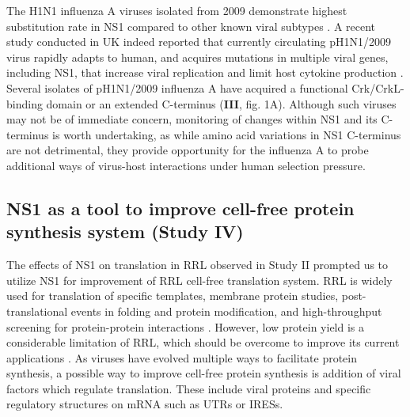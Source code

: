 		The H1N1 influenza A viruses isolated from 2009 demonstrate highest substitution rate in NS1 compared to other known viral subtypes \parencite{Xu2011}. A recent study conducted in UK indeed reported that currently circulating pH1N1/2009 virus rapidly adapts to human, and acquires mutations in multiple viral genes, including NS1, that increase viral replication and limit host cytokine production \parencite{Elderfield2014}. Several isolates of pH1N1/2009 influenza A have acquired a functional Crk/CrkL-binding domain or an extended C-terminus (\textbf{III}, fig. 1A). Although such viruses may not be of immediate concern, monitoring of changes within NS1 and its C-terminus is worth undertaking, as while amino acid variations in NS1 C-terminus are not detrimental, they provide opportunity for the influenza A to probe additional ways of virus-host interactions under human selection pressure.
		
		 
	
	\subsection{NS1 as a tool to improve cell-free protein synthesis system (Study IV)}
	
		The effects of NS1 on translation in \gls{RRL} observed in Study II prompted us to utilize NS1 for improvement of \gls{RRL} cell-free translation system. \gls{RRL} is widely used for translation of specific templates, membrane protein studies, post-translational events in folding and protein modification, and high-throughput screening for protein-protein interactions \parencite{Fuller2000, Douthwaite2012, Fixsen2010, Wang2011}. However, low protein yield is a considerable limitation of RRL, which should be overcome to improve its current applications \parencite{Carlson2012}. As viruses have evolved multiple ways to facilitate protein synthesis, a possible way to improve cell-free protein synthesis is addition of viral factors which regulate translation. These include viral proteins and specific regulatory structures on mRNA such as \gls{UTR}s or \glspl{IRES}. 
	
